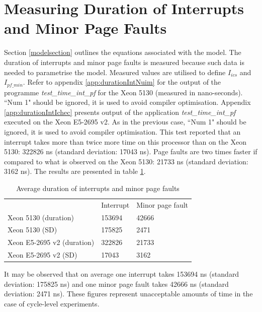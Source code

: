 \section{Measuring Duration of Interrupts and Minor Page Faults}
\label{resultsDurationIntPf}

Section \ref{modelsection} outlines the equations associated with the model. The duration of interrupts and minor page faults is measured because such data is needed to parametrise the model. Measured values are utilised to define $I_{ics}$ and $I_{pf\_min}$. Refer to appendix \ref{app:durationIntNuim} for the output of the programme \textit{test\_time\_int\_pf} for the Xeon 5130 (measured in nano-seconds). ``Num 1" should be ignored, it is used to avoid compiler optimisation. Appendix \ref{app:durationIntIchec} presents output of the application \textit{test\_time\_int\_pf} executed on the Xeon E5-2695 v2. As in the previous case, ``Num 1" should be ignored, it is used to avoid compiler optimisation. This test reported that an interrupt takes more than twice more time on this processor than on the Xeon 5130: 322826 ns (standard deviation: 17043 ns). Page faults are two times faster if compared to what is observed on the Xeon 5130: 21733 ns (standard deviation: 3162 ns). The results are presented in table \ref{intpfTable}.

\begin{table}
\caption{Average duration of interrupts and minor page faults}
\centering 
\begin{tabular}{lll}
                            & Interrupt & Minor page fault \\
Xeon 5130 (duration)        & 153694       & 42666  \\
Xeon 5130 (SD)              & 175825      & 2471    \\
Xeon E5-2695 v2 (duration)  & 322826       & 21733 \\
Xeon E5-2695 v2 (SD)        & 17043     & 3162
\end{tabular}
\label{intpfTable}
\end{table}

It may be observed that on average one interrupt takes 153694 ns (standard deviation: 175825 ns) and one minor page fault takes 42666 ns (standard deviation: 2471 ns). These figures represent unacceptable amounts of time in the case of cycle-level experiments.

